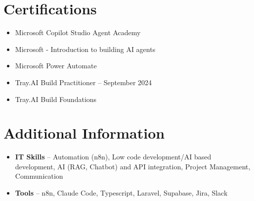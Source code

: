 \documentclass[a4paper,10pt]{article}
\begin{document}
\section{Certifications}
\begin{itemize}
\item Microsoft Copilot Studio Agent Academy
\item Microsoft - Introduction to building AI agents
\item Microsoft Power Automate
\item Tray.AI Build Practitioner -- September 2024
\item Tray.AI Build Foundations
\end{itemize}

\section{Additional Information}
\begin{itemize}
\item \textbf{IT Skills} -- Automation (n8n), Low code development/AI based development, AI (RAG, Chatbot) and API integration, Project Management, Communication
\item \textbf{Tools} -- n8n, Claude Code, Typescript, Laravel, Supabase, Jira, Slack
\end{itemize}
\end{document}

